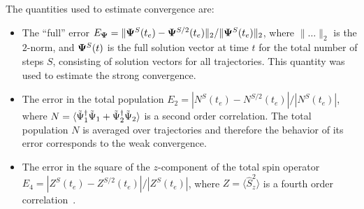 The quantities used to estimate convergence are:
\begin{itemize}
\item The ``full'' error $E_{\mathbf{\Psi}} = \| \mathbf{\Psi}^{S}(t_e) - \mathbf{\Psi}^{S / 2}(t_e) \|_2 / \| \mathbf{\Psi}^{S}(t_e) \|_2$, where $\|\ldots\|_2$ is the $2$-norm, and $\mathbf{\Psi}^{S}(t)$ is the full solution vector at time $t$ for the total number of steps $S$, consisting of solution vectors for all trajectories.
    This quantity was used to estimate the strong convergence.
\item The error in the total population $E_2 = |N^{S}(t_e) - N^{S / 2}(t_e)| / |N^{S}(t_e)|$, where $N = \langle \tilde{\Psi}_1^\dagger \tilde{\Psi}_1 + \tilde{\Psi}_2^\dagger \tilde{\Psi}_2 \rangle$ is a second order correlation.
    The total population $N$ is averaged over trajectories and therefore the behavior of its error corresponds to the weak convergence.
\item The error in the square of the $z$-component of the total spin operator $E_4 = |Z^{S}(t_e) - Z^{S / 2}(t_e)| / |Z^{S}(t_e)|$, where $Z = \langle \hat{S}^2_z \rangle$ is a fourth order correlation~.
\end{itemize}

